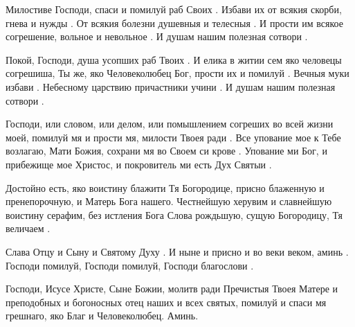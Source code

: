 \begin{mymulticols}




Милостиве Господи, спаси и помилуй раб Своих . Избави их от всякия скорби, гнева и нужды . От всякия болезни душевныя и телесныя . И прости им всякое согрешение, вольное и невольное . И душам нашим полезная сотвори . 




Покой, Господи, душа усопших раб Твоих . И елика в житии сем яко человецы согрешиша, Ты же, яко Человеколюбец Бог, прости их и помилуй . Вечныя муки избави . Небесному царствию причастники учини . И душам нашим полезная сотвори .




Господи, или словом, или делом, или помышлением согреших во всей жизни моей, помилуй мя и прости мя, милости Твоея ради . Все упование мое к Тебе возлагаю, Мати Божия, сохрани мя во Своем си крове . Упование ми Бог, и прибежище мое Христос, и покровитель ми есть Дух Святыи .


Достойно есть, яко воистину блажити Тя Богородице, присно блаженную и пренепорочную, и Матерь Бога нашего. Честнейшую херувим и славнейшую воистину серафим, без истления Бога Слова рождьшую, сущую Богородицу, Тя величаем .


Слава Отцу и Сыну и Святому Духу . И ныне и присно и во веки веком, аминь . Господи помилуй, Господи помилуй, Господи благослови . 




Господи, Исусе Христе, Сыне Божии, молитв ради Пречистыя Твоея Матере и преподобных и богоносных отец наших и всех святых, помилуй и спаси мя грешнаго, яко Благ и Человеколюбец. Аминь.



\end{mymulticols}
